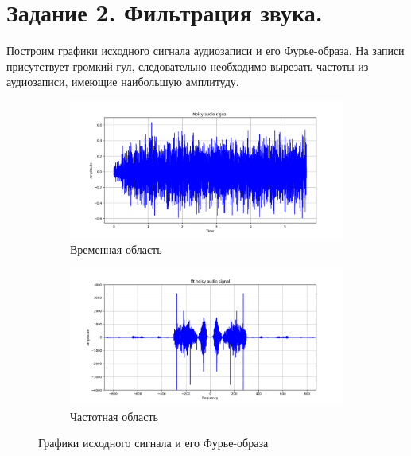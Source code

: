 \documentclass[a4paper, 12pt]{article}
\begin{document}
    \section{Задание 2. Фильтрация звука.}
    Построим графики исходного сигнала аудиозаписи и его Фурье-образа.
    На записи присутствует громкий гул, следовательно необходимо вырезать частоты из аудиозаписи, имеющие наибольшую амплитуду.
    \begin{figure}[H]
        \centering
        \begin{subfigure}{0.45\textwidth}
            \centering
            \includegraphics[width=\linewidth]{audio.png}
            \caption{Временная область}
            \label{fig:fig111}
        \end{subfigure}
        \hspace{5mm}
        \begin{subfigure}{0.45\textwidth}
            \centering
            \includegraphics[width=\linewidth]{U_audio.png}
            \caption{Частотная область}
            \label{fig:fig112}
        \end{subfigure}
        \caption{Графики исходного сигнала и его Фурье-образа}
        \label{fig:timefreq0}
    \end{figure}
    
\end{document}
